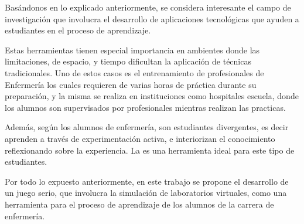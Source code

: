 Basándonos en lo explicado anteriormente, se considera interesante el campo de
investigación que involucra el desarrollo de aplicaciones tecnológicas que
ayuden a estudiantes en el proceso de aprendizaje. 

Estas herramientas tienen especial importancia en ambientes donde las limitaciones,
de espacio, y tiempo dificultan la aplicación de técnicas tradicionales. Uno de
estos casos es el entrenamiento de profesionales de Enfermería los cuales
requieren de varias horas de práctica durante su preparación, y la misma se
realiza en instituciones como hospitales escuela, donde los alumnos son
supervisados por profesionales mientras realizan las practicas.

Además, según \cite{humphreys2013developing} los alumnos de enfermería, son
estudiantes divergentes, es decir aprenden a través de experimentación activa, e
interiorizan el conocimiento reflexionando sobre la experiencia. La
 es una herramienta ideal para este tipo de
estudiantes\cite{humphreys2013developing}.

Por todo lo expuesto anteriormente, en este trabajo se propone el desarrollo de
un juego serio, que involucra la simulación de laboratorios virtuales, como una
herramienta para el proceso de aprendizaje de los alumnos de la carrera de
enfermería. 




